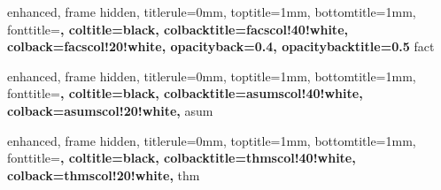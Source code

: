


{
  enhanced,
  frame hidden,
  titlerule=0mm,
  toptitle=1mm,
  bottomtitle=1mm,
  fonttitle=\bfseries\large,
  coltitle=black,
  colbacktitle=facscol!40!white,
  colback=facscol!20!white,
  opacityback=0.4, %
  opacitybacktitle=0.5
}{fact}


{
  enhanced,
  frame hidden,
  titlerule=0mm,
  toptitle=1mm,
  bottomtitle=1mm,
  fonttitle=\bfseries\large,
  coltitle=black,
  colbacktitle=asumscol!40!white,
  colback=asumscol!20!white,
}{asum}




{
  enhanced,
  frame hidden,
  titlerule=0mm,
  toptitle=1mm,
  bottomtitle=1mm,
  fonttitle=\bfseries\large,
  coltitle=black,
  colbacktitle=thmscol!40!white,
  colback=thmscol!20!white,
}{thm}

